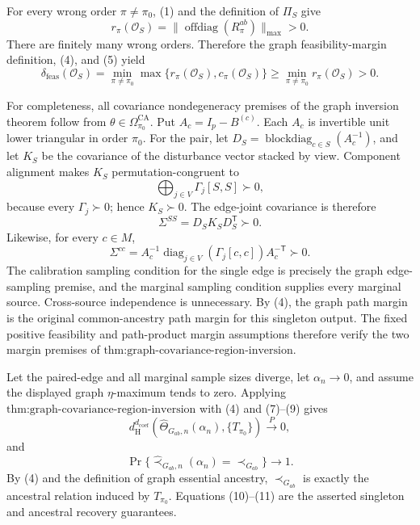 For every wrong order \(\pi\ne\pi_0\), (1) and the definition of \(\Pi_S\) give
\[
r_\pi(\mathcal O_S)=
\|\operatorname{offdiag}(R_\pi^{ab})\|_{\max}>0.
\tag{5}
\]
There are finitely many wrong orders.  Therefore the graph feasibility-margin definition, (4), and (5) yield
\[
\delta_{\mathrm{feas}}(\mathcal O_S)
=\min_{\pi\ne\pi_0}\max\{r_\pi(\mathcal O_S),c_\pi(\mathcal O_S)\}
\ge\min_{\pi\ne\pi_0}r_\pi(\mathcal O_S)>0.
\tag{6}
\]

For completeness, all covariance nondegeneracy premises of the graph inversion theorem follow from \(\theta\in\Omega_{\pi_0}^{\mathrm{CA}}\).  Put \(A_c=I_p-B^{(c)}\).  Each \(A_c\) is invertible unit lower triangular in order \(\pi_0\).  For the pair, let \(D_S=\operatorname{blockdiag}_{c\in S}(A_c^{-1})\), and let \(K_S\) be the covariance of the disturbance vector stacked by view.  Component alignment makes \(K_S\) permutation-congruent to
\[
\bigoplus_{j\in V}\Gamma_j[S,S]\succ0,
\tag{7}
\]
because every \(\Gamma_j\succ0\); hence \(K_S\succ0\).  The edge-joint covariance is therefore
\[
\Sigma^{SS}=D_SK_SD_S^{\mathsf T}\succ0.
\tag{8}
\]
Likewise, for every \(c\in M\),
\[
\Sigma^{cc}=A_c^{-1}
\operatorname{diag}_{j\in V}(\Gamma_j[c,c])
A_c^{-\mathsf T}\succ0.
\tag{9}
\]
The calibration sampling condition for the single edge is precisely the graph edge-sampling premise, and the marginal sampling condition supplies every marginal source.  Cross-source independence is unnecessary.  By (4), the graph path margin is the original common-ancestry path margin for this singleton output.  The fixed positive feasibility and path-product margin assumptions therefore verify the two margin premises of \(\text{thm:graph-covariance-region-inversion}\).

Let the paired-edge and all marginal sample sizes diverge, let \(\alpha_n\to0\), and assume the displayed graph \(\eta\)-maximum tends to zero.  Applying \(\text{thm:graph-covariance-region-inversion}\) with (4) and (7)--(9) gives
\[
d_{\mathrm H}^{d_{\mathrm{coef}}}
(\widehat\Theta_{G_{ab},n}(\alpha_n),\{T_{\pi_0}\})
\xrightarrow{P}0,
\tag{10}
\]
and
\[
\Pr\{\widehat\prec_{G_{ab},n}(\alpha_n)=\prec_{G_{ab}}\}
\longrightarrow1.
\tag{11}
\]
By (4) and the definition of graph essential ancestry, \(\prec_{G_{ab}}\) is exactly the ancestral relation induced by \(T_{\pi_0}\).  Equations (10)--(11) are the asserted singleton and ancestral recovery guarantees.
